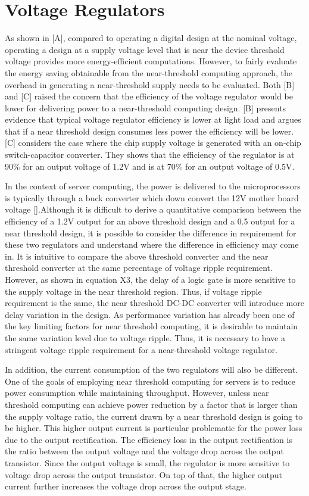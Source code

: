 \section{Voltage Regulators}

As shown in [A], compared to operating a digital design at the nominal voltage,
operating a design at a supply voltage level that is near the device threshold
voltage provides more energy-efficient computations. However, to fairly evaluate
the energy saving obtainable from the near-threshold computing approach, the
overhead in generating a near-threshold supply needs to be evaluated. Both [B]
and [C] raised the concern that the efficiency of the voltage regulator would be
lower for delivering power to a near-threshold computing design. [B] presents
evidence that typical voltage regulator efficiency is lower at light load and
argues that if a near threshold design consumes less power the efficiency will
be lower.  [C] considers the case where the chip supply voltage is generated
with an on-chip switch-capacitor converter. They shows that the efficiency of
the regulator is at 90\% for an output voltage of 1.2V and is at 70\% for an
output voltage of 0.5V.   

In the context of server computing, the power is delivered to the
microprocessors is typically through a buck converter which down convert the 12V
mother board voltage [].Although it is difficult to derive a quantitative
comparison between the efficiency of a 1.2V output for an above threshold design
and a 0.5 output for a near threshold design, it is possible to consider the
difference in requirement for these two regulators and understand where the
difference in efficiency may come in. It is intuitive to compare the above
threshold converter and the near threshold converter at the same percentage of
voltage ripple requirement. However, as shown in equation X3, the delay of a
logic gate is more sensitive to the supply voltage in the near threshold region.
Thus, if voltage ripple requirement is the same, the near threshold DC-DC
converter will introduce more delay variation in the design. As performance
variation has already been one of the key limiting factors for near threshold
computing, it is desirable to maintain the same variation level due to voltage
ripple. Thus, it is necessary to have a stringent voltage ripple requirement for
a near-threshold voltage regulator. 

In addition, the current consumption of the two regulators will also be
different. One of the goals of employing near threshold computing for servers is
to reduce power consumption while maintaining throughput. However, unless near
threshold computing can achieve power reduction by a factor that is larger than
the supply voltage ratio, the current drawn by a near threshold design is going
to be higher. This higher output current is particular problematic for the power
loss due to the output rectification. The efficiency loss in the output
rectification is the ratio between the output voltage and the voltage drop
across the output transistor. Since the output voltage is small, the regulator
is more sensitive to voltage drop across the output transistor. On top of that,
the higher output current further increases the voltage drop across the output
stage.  


